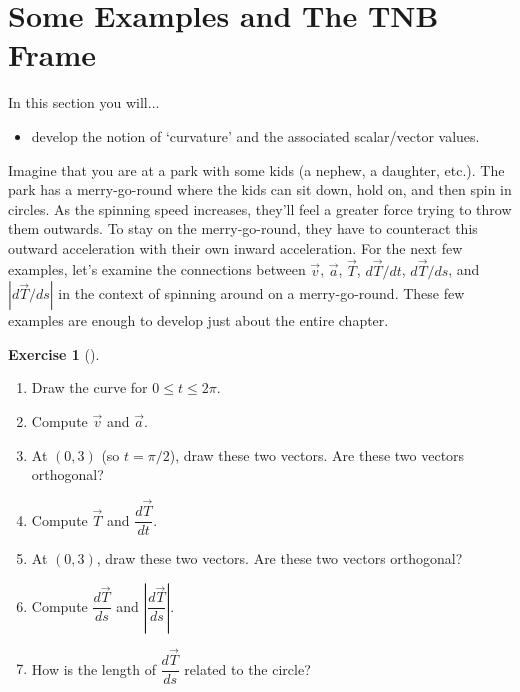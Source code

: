 \documentclass[10pt,]{book}
\theoremstyle{plain}
\theoremstyle{definition}
\theoremstyle{definition}
\theoremstyle{definition}
\theoremstyle{definition}
\newtheorem{exploration}[project]{Exercise}
\theoremstyle{definition}
\numberwithin{equation}{section}
\begin{document}
\section[{Some Examples and The TNB Frame}]{Some Examples and The TNB Frame}\label{section-26}
In this section you will... \leavevmode%
\begin{itemize}[label=\textbullet]
\item{}develop the notion of `curvature' and the associated scalar/vector values.%
\end{itemize}
%
\par
Imagine that you are at a park with some kids (a nephew, a daughter, etc.). The park has a merry-go-round where the kids can sit down, hold on, and then spin in circles. As the spinning speed increases, they'll feel a greater force trying to throw them outwards. To stay on the merry-go-round, they have to counteract this outward acceleration with their own inward acceleration. For the next few examples, let's examine the connections between \(\vec v\), \(\vec a\), \(\vec T\), \(d\vec T/dt\), \(d\vec T/ds\), and \(|d\vec T/ds|\) in the context of spinning around on a merry-go-round. These few examples are enough to develop just about the entire chapter.%
\begin{exploration}[]\label{exploration-169}
\leavevmode%
\begin{enumerate}[font=\bfseries,label=(\alph*),ref=\alph*]
\item\label{task-401} Draw the curve for \(0\leq t\leq 2\pi\).%
\item\label{task-402} Compute \(\vec v\) and \(\vec a\).%
\item\label{task-403} At \((0,3)\) (so \(t=\pi/2\)), draw these two vectors. Are these two vectors orthogonal?%
\item\label{task-404} Compute \(\vec T\) and \(\dfrac{d\vec T}{dt}\).%
\item\label{task-405} At \((0,3)\), draw these two vectors. Are these two vectors orthogonal?%
\item\label{task-406} Compute \(\dfrac{d\vec T}{ds}\) and \(\left|\dfrac{d\vec T}{ds}\right|\).%
\item\label{task-407} How is the length of \(\dfrac{d\vec T}{ds}\) related to the circle?%
\end{enumerate}
\end{exploration}
\end{document}
